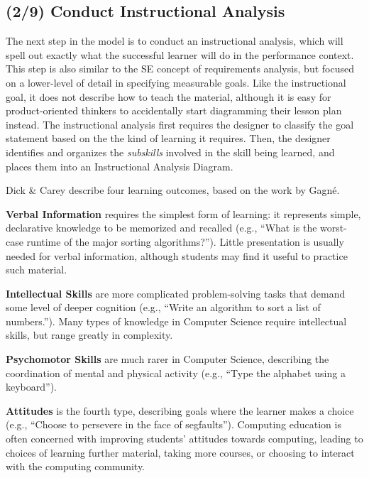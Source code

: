 \subsection{(2/9) Conduct Instructional Analysis}
\label{learner-and-context}


The next step in the model is to conduct an instructional analysis, which will spell out exactly what the successful learner will do in the performance context.
This step is also similar to the SE concept of requirements analysis, but focused on a lower-level of detail in specifying measurable goals.
Like the instructional goal, it does not describe how to teach the material, although it is easy for product-oriented thinkers to accidentally start diagramming their lesson plan instead.
The instructional analysis first requires the designer to classify the goal statement based on the the kind of learning it requires.
Then, the designer identifies and organizes the \emph{subskills} involved in the skill being learned, and places them into an Instructional Analysis Diagram.

Dick \& Carey describe four learning outcomes, based on the work by Gagn\'{e}.

\textbf{Verbal Information} requires the simplest form of learning: it represents simple, declarative knowledge to be memorized and recalled (e.g., ``What is the worst-case runtime of the major sorting algorithms?'').
Little presentation is usually needed for verbal information, although students may find it useful to practice such material.

\textbf{Intellectual Skills} are more complicated problem-solving tasks that demand some level of deeper cognition (e.g., ``Write an algorithm to sort a list of numbers.''). 
Many types of knowledge in Computer Science require intellectual skills, but range greatly in complexity.

\textbf{Psychomotor Skills} are much rarer in Computer Science, describing the coordination of mental and physical activity (e.g., ``Type the alphabet using a keyboard'').

\textbf{Attitudes} is the fourth type, describing goals where the learner makes a choice (e.g., ``Choose to persevere in the face of segfaults'').
Computing education is often concerned with improving students' attitudes towards computing, leading to choices of learning further material, taking more courses, or choosing to interact with the computing community.

